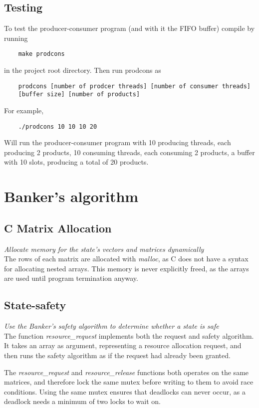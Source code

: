 \documentclass[a4paper, titlepage]{article}
\begin{document}
\subsection{Testing}
To test the producer-consumer program (and with it the FIFO buffer) compile by
running
\begin{verbatim}
	make prodcons
\end{verbatim}
in the project root directory. Then run prodcons as
\begin{verbatim}
	prodcons [number of prodcer threads] [number of consumer threads]
	[buffer size] [number of products]
\end{verbatim}
For example,
\begin{verbatim}
	./prodcons 10 10 10 20
\end{verbatim}
Will run the producer-consumer program with 10 producing threads, each
producing 2 products, 10 consuming threads, each consuming 2 products, a buffer
with 10 slots, producing a total of 20 products.

\section{Banker's algorithm}
\subsection{C Matrix Allocation}
\textit{Allocate memory for the state's vectors and matrices dynamically}\\

The rows of each matrix are allocated with \emph{malloc}, as C does not have a
syntax for allocating nested arrays. This memory is never explicitly freed, as
the arrays are used until program termination anyway.

\subsection{State-safety}
\textit{Use the Banker's safety algorithm to determine whether a state is
safe}\\

The function \emph{resource\_request} implements both the request and safety
algorithm. It takes an array as argument, representing a resource allocation
request, and then runs the safety algorithm as if the request had already been
granted.

The \emph{resource\_request} and \emph{resource\_release} functions both
operates on the same matrices, and therefore lock the same mutex before writing
to them to avoid race conditions. Using the same mutex ensures that deadlocks
can never occur, as a deadlock needs a minimum of two locks to wait on.
\end{document}
